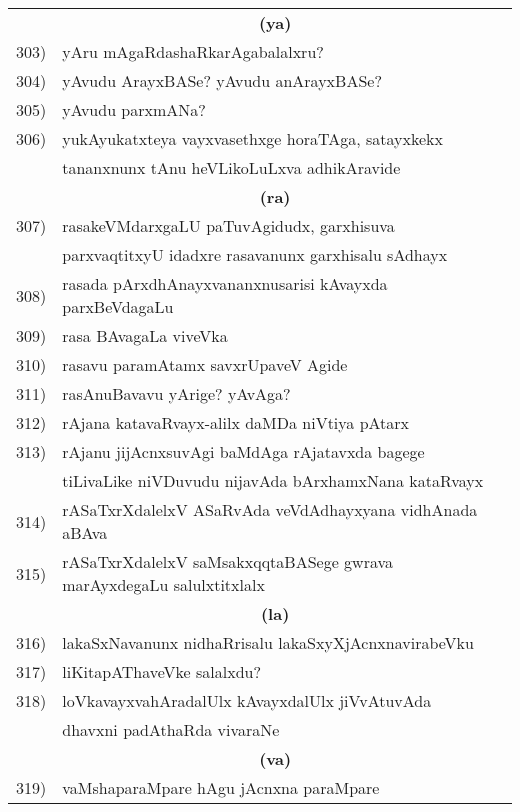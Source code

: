 {\begin{longtable}{@{}cp{7.4cm}r}
     & \multicolumn{1}{c}{\textbf{(ya)}} & \\[0.3cm]
303) & yAru mAgaRdashaRkarAgabalalxru? & \pageref{page24}\\
304)& yAvudu ArayxBASe? yAvudu anArayxBASe? & \pageref{page174}\\
305) & yAvudu parxmANa? & \pageref{page134}\\
306) & yukAyukatxteya vayxvasethxge horaTAga, satayxkekx & \\
     & tananxnunx tAnu heVLikoLuLxva adhikAravide & \pageref{page249}\\[0.3cm]
     & \multicolumn{1}{c}{\textbf{(ra)}} & \\[0.3cm]
307) &  rasakeVMdarxgaLU paTuvAgidudx, garxhisuva & \\
     & parxvaqtitxyU idadxre rasavanunx garxhisalu sAdhayx & \pageref{page222}\\         
308) & rasada pArxdhAnayxvananxnusarisi kAvayxda parxBeVdagaLu & \pageref{page240}\\
309) & rasa BAvagaLa viveVka    & \pageref{page224}\\ 
310) & rasavu paramAtamx savxrUpaveV Agide & \pageref{page222}\\
311) & rasAnuBavavu yArige? yAvAga? &\pageref{page227}\\
312) & rAjana katavaRvayx-alilx daMDa niVtiya pAtarx &\pageref{page92}\\
313) & rAjanu jijAcnxsuvAgi baMdAga rAjatavxda bagege  & \\
     & tiLivaLike niVDuvudu nijavAda bArxhamxNana kataRvayx &\pageref{page253}\\ 
314) & rASaTxrXdalelxV ASaRvAda veVdAdhayxyana vidhAnada aBAva & \pageref{page47}\\
315) & rASaTxrXdalelxV saMsakxqqtaBASege gwrava marAyxdegaLu salulxtitxlalx & \pageref{page30}\\[0.3cm]
     & \multicolumn{1}{c}{\textbf{(la)}} & \\[0.3cm]
316) & lakaSxNavanunx nidhaRrisalu lakaSxyXjAcnxnavirabeVku & \pageref{page3}\\
317) & liKitapAThaveVke salalxdu? & \pageref{page123}\\
318) & loVkavayxvahAradalUlx kAvayxdalUlx jiVvAtuvAda & \\
     & dhavxni padAthaRda vivaraNe & \pageref{page235}\\[0.3cm]  
     & \multicolumn{1}{c}{\textbf{(va)}} & \\[0.3cm]
319) & vaMshaparaMpare hAgu jAcnxna paraMpare &  \pageref{page139}\\

\end{longtable}}
